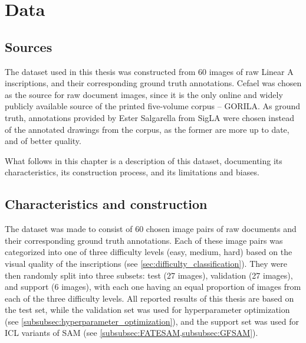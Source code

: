 \chapter{Data}
\section{Sources}
The dataset used in this thesis was constructed from 60 images of raw Linear A inscriptions, and their corresponding ground truth annotations.
\acs{Cefael} \parencite{EtudesCretoises21} was chosen as the source for raw document images, since it is the only online and widely publicly available source of the printed five-volume corpus -- \acs{GORILA}. 
As ground truth, annotations provided by Ester Salgarella from SigLA \parencite{SalgarellaCastellanSigLA2020} were chosen instead of the annotated drawings from the corpus, as the former are more up to date, and of better quality.

What follows in this chapter is a description of this dataset, documenting its characteristics, its construction process, and its limitations and biases.

\section{Characteristics and construction}
\label{sec:dataset}
The dataset was made to consist of 60 chosen image pairs of raw documents and their corresponding ground truth annotations.
Each of these image pairs was categorized into one of three difficulty levels (easy, medium, hard) based on the visual quality of the inscriptions (see \cref{sec:difficulty_classification}).
They were then randomly split into three subsets: test (27 images), validation (27 images), and support (6 images), with each one having an equal proportion of images from each of the three difficulty levels.
All reported results of this thesis are based on the test set, while the validation set was used for hyperparameter optimization (see \cref{subsubsec:hyperparameter_optimization}), and the support set was used for \acs{ICL} variants of \acs{SAM} (see \cref{subsubsec:FATESAM,subsubsec:GFSAM}).

